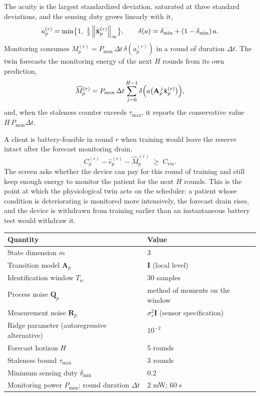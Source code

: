 The acuity is the largest standardized deviation, saturated at three standard deviations, and the sensing duty grows linearly with it,
\begin{equation}
	a_p^{(r)}=\min\bigl\{1,\;\tfrac{1}{3}\left\lVert \hat{\mathbf{x}}_p^{(r)} \right\rVert_{\infty}\bigr\},\qquad \delta(a)=\delta_{\min}+(1-\delta_{\min})\,a .
	\label{eq:acuity}
\end{equation}
Monitoring consumes $M_p^{(r)}=P_{\mathrm{mon}}\,\Delta t\,\delta(a_p^{(r)})$ in a round of duration $\Delta t$. The twin forecasts the monitoring energy of the next $H$ rounds from its own prediction,
\begin{equation}
	\widehat{M}_p^{(r)}=P_{\mathrm{mon}}\,\Delta t\sum_{j=0}^{H-1}\delta\Bigl(a\bigl(\mathbf{A}_p^{\,j}\hat{\mathbf{x}}_p^{(r)}\bigr)\Bigr),
	\label{eq:forecast}
\end{equation}
and, when the staleness counter exceeds $\tau_{\max}$, it reports the conservative value $H\,P_{\mathrm{mon}}\Delta t$.

A client is battery-feasible in round $r$ when training would leave the reserve intact after the forecast monitoring drain,
\begin{equation}
	C_p^{(r)}-\hat e_p^{(r)}-\widehat{M}_p^{(r)}\;\ge\;C_{\mathrm{res}} .
	\label{eq:screen}
\end{equation}
The screen asks whether the device can pay for this round of training and still keep enough energy to monitor the patient for the next $H$ rounds. This is the point at which the physiological twin acts on the scheduler: a patient whose condition is deteriorating is monitored more intensively, the forecast drain rises, and the device is withdrawn from training earlier than an instantaneous battery test would withdraw it.

\begin{table}[t]
	\centering
	\label{tab:twincfg}
	\footnotesize
	\begin{tabularx}{\columnwidth}{>{\raggedright\arraybackslash}X l}
		\toprule
		\textbf{Quantity} & \textbf{Value} \\
		\midrule
		State dimension $m$ & 3 \\
		Transition model $\mathbf{A}_p$ & $\mathbf{I}$ (local level) \\
		Identification window $T_w$ & 30 samples \\
		Process noise $\mathbf{Q}_p$ & method of moments on the window \\
		Measurement noise $\mathbf{R}_p$ & $\sigma_v^2\mathbf{I}$ (sensor specification) \\
		Ridge parameter (autoregressive alternative) & $10^{-2}$ \\
		Forecast horizon $H$ & 5 rounds \\
		Staleness bound $\tau_{\max}$ & 3 rounds \\
		Minimum sensing duty $\delta_{\min}$ & 0.2 \\
		Monitoring power $P_{\mathrm{mon}}$; round duration $\Delta t$ & 2 mW; 60 s \\
		\bottomrule
	\end{tabularx}
\end{table}

